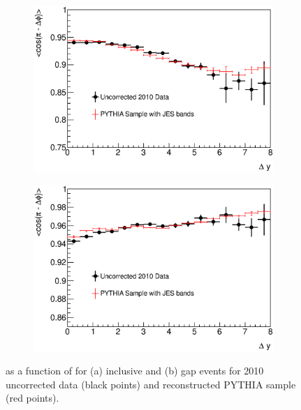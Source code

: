 \begin{figure}
\centering
        \begin{subfigure}[b]{0.5\textwidth}
                \centering
                \includegraphics[width=\textwidth]{figures/GBJ2/ControlPlots/Smeared__cosdPhi_deltaY.eps}
        \end{subfigure}%
        \begin{subfigure}[b]{0.5\textwidth}
                \centering
                \includegraphics[width=\textwidth]{figures/GBJ2/ControlPlots/Smeared__cosdPhi_deltaY_gap.eps}
        \end{subfigure}%
\caption[Comparison of the data and PYTHIA for \cosdphi{}]{
\mean{\cosdphi{}} as a function of \dy{} for (a) inclusive and (b) gap events for 2010 uncorrected data (black points) and reconstructed PYTHIA sample (red points).
\label{GBJ2:Uncorr:cos}}
\end{figure}


